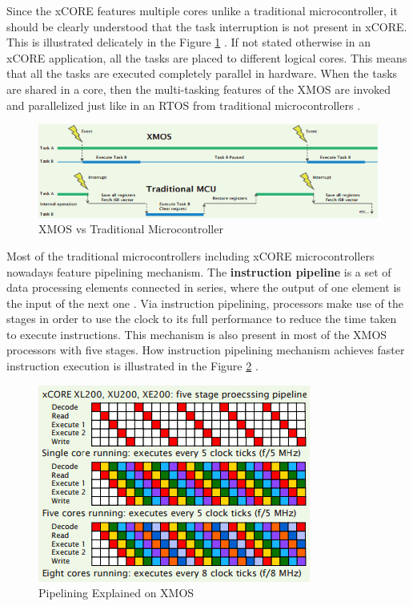 Since the xCORE features multiple cores unlike a traditional microcontroller, it should be clearly understood that the task interruption is not present in xCORE. This is illustrated delicately in the Figure \ref{fig:xmosvstraditional} \cite{xmosflyer}. If not stated otherwise in an xCORE application, all the tasks are placed to different logical cores. This means that all the tasks are executed completely parallel in hardware. When the tasks are shared in a core, then the multi-tasking features of the XMOS are invoked and parallelized just like in an RTOS from traditional microcontrollers \cite{xmosflyer}.
\begin{figure}[!ht]
	\includegraphics[scale=0.72]{content/images/xmosvstraditional.png}
	\caption{XMOS vs Traditional Microcontroller \cite{xmosflyer}}
	\label{fig:xmosvstraditional}
\end{figure}

Most of the traditional microcontrollers including xCORE microcontrollers nowadays feature pipelining mechanism. The \textbf{instruction pipeline} is a set of data processing elements connected in series, where the output of one element is the input of the next one \cite{pipelinebook}. Via instruction pipelining, processors make use of the stages in order to use the clock to its full performance to reduce the time taken to execute instructions. This mechanism is also present in most of the XMOS processors with five stages. How instruction pipelining mechanism achieves faster instruction execution is illustrated in the Figure \ref{fig:pipeline} \cite{xmosflyer}.
\begin{figure}[!ht]
	\includegraphics[scale=0.9]{content/images/pipeline.png}
	\caption{Pipelining Explained on XMOS \cite{xmosflyer}}
	\label{fig:pipeline}
\end{figure}


